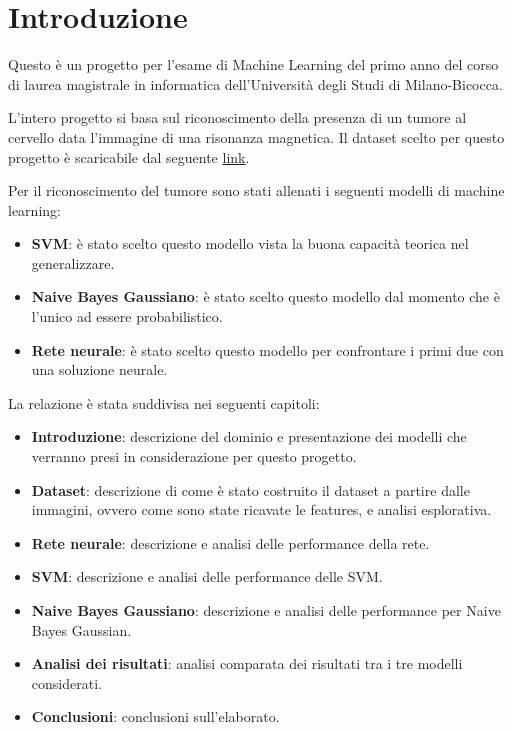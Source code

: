 \chapter{Introduzione}

Questo è un progetto per l'esame di Machine Learning del primo anno del corso 
di laurea magistrale in informatica dell'Università degli Studi di Milano-Bicocca.

L'intero progetto si basa sul riconoscimento della presenza di un tumore al cervello
data l'immagine di una risonanza magnetica. Il dataset scelto per questo progetto
è scaricabile dal seguente \href{https://www.kaggle.com/datasets/jakeshbohaju/brain-tumor/data}{link}.

Per il riconoscimento del tumore sono stati allenati i seguenti modelli di machine
learning:
\begin{itemize}
    \item \textbf{SVM}: è stato scelto questo modello vista la buona capacità
    teorica nel generalizzare.
    \item \textbf{Naive Bayes Gaussiano}: è stato scelto questo modello dal momento
    che è l'unico ad essere probabilistico.
    \item \textbf{Rete neurale}: è stato scelto questo modello per confrontare 
    i primi due con una soluzione neurale.
\end{itemize}

La relazione è stata suddivisa nei seguenti capitoli:
\begin{itemize}
    \item \textbf{Introduzione}: descrizione del dominio e presentazione dei modelli che 
    verranno presi in considerazione per questo progetto.
    \item \textbf{Dataset}: descrizione di come è stato costruito il dataset a partire
    dalle immagini, ovvero come sono state ricavate le features, e analisi esplorativa.
    \item \textbf{Rete neurale}: descrizione e analisi delle performance della rete.
    \item \textbf{SVM}: descrizione e analisi delle performance delle SVM.
    \item \textbf{Naive Bayes Gaussiano}: descrizione e analisi delle performance 
    per Naive Bayes Gaussian.
    \item \textbf{Analisi dei risultati}: analisi comparata dei risultati tra i 
    tre modelli considerati.
    \item \textbf{Conclusioni}: conclusioni sull'elaborato.
\end{itemize}